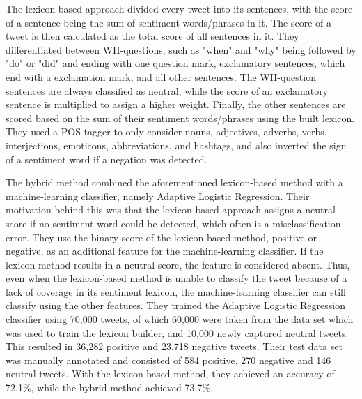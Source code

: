 The lexicon-based approach divided every tweet into its sentences, with the score of a sentence being the sum of sentiment words/phrases in it. The score of a tweet is then calculated as the total score of all sentences in it. They differentiated between WH-questions, such as "when" and "why" being followed by "do" or "did" and ending with one question mark, exclamatory sentences, which end with a exclamation mark, and all other sentences. The WH-question sentences are always classified as neutral, while the score of an exclamatory sentence is multiplied to assign a higher weight. Finally, the other sentences are scored based on the sum of their sentiment words/phrases using the built lexicon. They used a POS tagger to only consider nouns, adjectives, adverbs, verbs, interjections, emoticons, abbreviations, and hashtags, and also inverted the sign of a sentiment word if a negation was detected.

The hybrid method combined the aforementioned lexicon-based method with a machine-learning classifier, namely Adaptive Logistic Regression. Their motivation behind this was that the lexicon-based approach assigns a neutral score if no sentiment word could be detected, which often is a misclassification error. They use the binary score of the lexicon-based method, positive or negative, as an additional feature for the machine-learning classifier. If the lexicon-method results in a neutral score, the feature is considered absent. Thus, even when the lexicon-based method is unable to classify the tweet because of a lack of coverage in its sentiment lexicon, the machine-learning classifier can still classify using the other features. They trained the Adaptive Logistic Regression classifier using 70,000 tweets, of which 60,000 were taken from the data set which was used to train the lexicon builder, and 10,000 newly captured neutral tweets. This resulted in 36,282 positive and 23,718 negative tweets. Their test data set was manually annotated and consisted of 584 positive, 270 negative and 146 neutral tweets. With the lexicon-based method, they achieved an accuracy of 72.1\%, while the hybrid method achieved 73.7\%.










